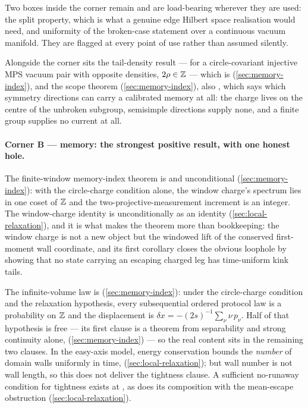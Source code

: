Two boxes inside the corner remain \statusSketch{} and are load-bearing
wherever they are used: the split property, which is what a genuine edge
Hilbert space realisation would need, and uniformity of the broken-case
statement over a continuous vacuum manifold. They are flagged at every point
of use rather than assumed silently.

Alongside the corner sits the tail-density result --- for a circle-covariant
injective MPS vacuum pair with opposite densities, $2\rho\in\mathbb{Z}$ --- which is
\statusProved{} (\cref{sec:memory-index}), and the scope theorem
(\cref{sec:memory-index}), also \statusProved{}, which says which symmetry
directions can carry a calibrated memory at all: the charge lives on the
centre of the unbroken subgroup, semisimple directions supply none, and a
finite group supplies no current at all.

\paragraph{Corner B --- memory: the strongest positive result, with one
honest hole.}
The finite-window memory-index theorem is \statusProved{} and unconditional
(\cref{sec:memory-index}): with the circle-charge condition alone, the window
charge's spectrum lies in one coset of $\mathbb{Z}$ and the two-projective-measurement
increment is an integer. The window-charge identity is \statusProved{}
unconditionally as an identity (\cref{sec:local-relaxation}), and it is what
makes the theorem more than bookkeeping: the window charge is not a new
object but the windowed lift of the conserved first-moment wall coordinate,
and its first corollary closes the obvious loophole by showing that no state
carrying an escaping charged leg has time-uniform kink tails.

The infinite-volume law is \statusProvedConditional{}
(\cref{sec:memory-index}): under the circle-charge condition and the
relaxation hypothesis, every subsequential ordered protocol law is a
probability on $\mathbb{Z}$ and the displacement is
$\delta x=-(2s)^{-1}\sum_\nu\nu\,p_\nu$. Half of that hypothesis is free ---
its first clause is a theorem from separability and strong continuity alone,
\statusProved{} (\cref{sec:memory-index}) --- so the real content sits in the
remaining two clauses. In the easy-axis model, energy conservation bounds the
\emph{number} of domain walls uniformly in time, \statusProved{}
(\cref{sec:local-relaxation}); but wall number is not wall length, so this
does not deliver the tightness clause. A sufficient no-runaway condition for
tightness exists at \statusSketch{}, as does its composition with the
mean-escape obstruction (\cref{sec:local-relaxation}).

